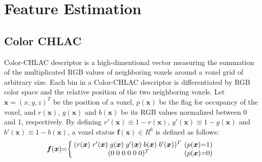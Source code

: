 \documentclass[conference]{sty/IEEEtran}
\begin{document}
\section{Feature Estimation}
\label{sec:features}

\subsection{Color CHLAC}
Color-CHLAC descriptor is a high-dimentional vector measuring the summation of the multiplicated RGB values of neighboring voxels around a voxel grid of arbitrary size. 
Each bin in a Color-CHLAC descriptor is differentiated by RGB color space and the relative position of the two neighboring voxels. 
Let $\bm{x}=(x,y,z)^T$ be the position of a voxel, $p(\bm{x})$ be the flag for occupancy of the voxel, 
 and $r(\bm{x})$, $g(\bm{x})$ and $b(\bm{x})$ be its RGB values normalized between 0 and 1, respectively. 
By defining $r'(\bm{x}) \equiv 1 - r(\bm{x})$, $g'(\bm{x}) \equiv 1 - g(\bm{x})$ and $b'(\bm{x}) \equiv 1 - b(\bm{x})$, 
    a voxel status $\bm{f}(\bm{x})\in R^6$ is defined as follows: 
\begin{eqnarray*}
  \label{eq:voxel}
  \bm{f}({\bm x})\hspace{-1mm}=\hspace{-1mm}\left\{
  \begin{array}{cc}
    \hspace{-1mm}
    (r({\bm x})\hspace{1mm} r'({\bm x}) \hspace{1mm}g({\bm x}) \hspace{1mm}g'({\bm x}) \hspace{1mm}b({\bm x}) \hspace{1mm}b'({\bm x}))^T & \hspace{-2mm}(p({\bm x})\hspace{-1mm}=\hspace{-1mm}1) \\
    (0\hspace{1mm}0\hspace{1mm}0\hspace{1mm}0\hspace{1mm}0\hspace{1mm}0)^T & \hspace{-2mm}(p({\bm x})\hspace{-1mm}=\hspace{-1mm}0)
  \end{array}\right.
\end{eqnarray*}
\end{document}
